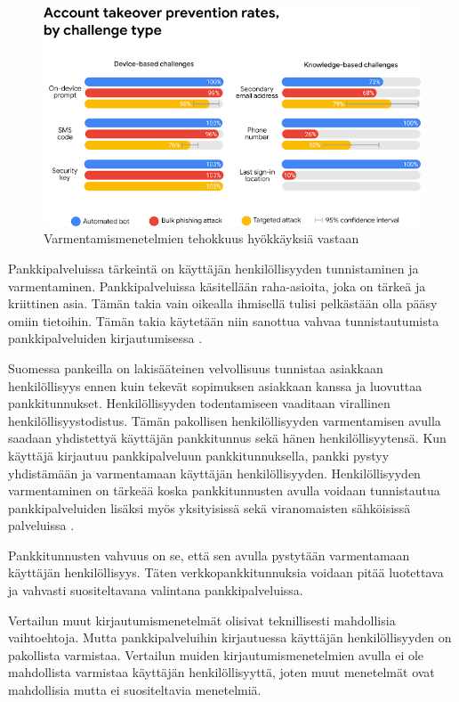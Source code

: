 \begin{figure}[ht]
    \centering
    \includegraphics[width=12cm]{template/figures/account takeover provention rates.png}
    \caption{Varmentamismenetelmien tehokkuus hyökkäyksiä vastaan \citep{google_security}}
    \label{fig:account_takeover_rates}
\end{figure}

Pankkipalveluissa tärkeintä on käyttäjän henkilöllisyyden tunnistaminen ja varmentaminen. Pankkipalveluissa käsitellään raha-asioita, joka on tärkeä ja kriittinen asia. Tämän takia vain oikealla ihmisellä tulisi pelkästään olla pääsy omiin tietoihin. Tämän takia käytetään niin sanottua vahvaa tunnistautumista pankkipalveluiden kirjautumisessa \citep{kpclient}.

Suomessa pankeilla on lakisääteinen velvollisuus tunnistaa asiakkaan henkilöllisyys ennen kuin tekevät sopimuksen asiakkaan kanssa ja luovuttaa pankkitunnukset. Henkilöllisyyden todentamiseen vaaditaan virallinen henkilöllisyystodistus. Tämän pakollisen henkilöllisyyden varmentamisen avulla saadaan yhdistettyä käyttäjän pankkitunnus sekä hänen henkilöllisyytensä. Kun käyttäjä kirjautuu pankkipalveluun pankkitunnuksella, pankki pystyy yhdistämään ja varmentamaan käyttäjän henkilöllisyyden. Henkilöllisyyden varmentaminen on tärkeää koska pankkitunnusten avulla voidaan tunnistautua pankkipalveluiden lisäksi myös yksityisissä sekä viranomaisten sähköisissä palveluissa \citep{FINE_verkkopankkitunnukset}.

Pankkitunnusten vahvuus on se, että sen avulla pystytään varmentamaan käyttäjän henkilöllisyys. Täten verkkopankkitunnuksia voidaan pitää luotettava ja vahvasti suositeltavana valintana pankkipalveluissa.

Vertailun muut kirjautumismenetelmät olisivat teknillisesti mahdollisia vaihtoehtoja. Mutta pankkipalveluihin kirjautuessa käyttäjän henkilöllisyyden on pakollista varmistaa. Vertailun muiden kirjautumismenetelmien avulla ei ole mahdollista varmistaa käyttäjän henkilöllisyyttä, joten muut menetelmät ovat mahdollisia mutta ei suositeltavia menetelmiä.

